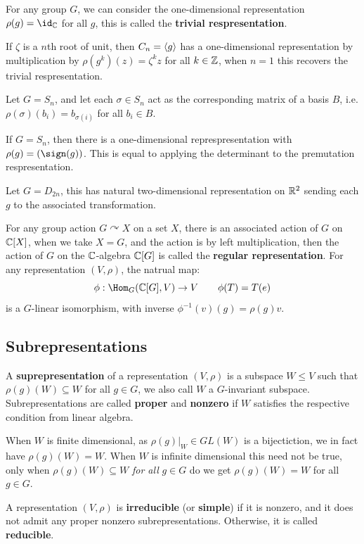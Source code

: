 \documentclass{article}
\begin{document}
For any group $G$, we can consider the one-dimensional representation $\rho(g)=\id_\bC$ for all $g$, this is called the \textbf{trivial respresentation}.

If $\zeta$ is a $n$th root of unit, then $C_n=\left\langle g \right\rangle$ has a one-dimensional representation by multiplication by $\rho(g^k)(z)=\zeta^k z$ for all $k\in\mathbb{Z}$, when $n=1$ this recovers the trivial respresentation.

Let $G=S_n$, and let each $\sigma\in S_n$ act as the corresponding matrix of a basis $B$, i.e. $\rho(\sigma)(b_i)=b_{\sigma(i)}$ for all $b_i\in B$.

If $G=S_n$, then there is a one-dimensional represpresentation with $\rho(g)=(\sign(g))$. This is equal to applying the determinant to the premutation respresentation.

Let $G=D_{2n}$, this has natural two-dimensional representation on $\mathbb{R}^2$ sending each $g$ to the associated transformation.

For any group action $G\curvearrowright X$ on a set $X$, there is an associated action of $G$ on $\mathbb{C}[X]$, when we take $X=G$, and the action is by left multiplication, then the action of $G$ on the $\mathbb{C}$-algebra $\mathbb{C}[G]$ is called the \textbf{regular representation}. For any representation $(V,\rho)$, the natrual map: \[
    \phi: \Hom_G(\bC[G],V)\rightarrow V \qquad \phi(T) = T(e)
\] is a $G$-linear isomorphism, with inverse $\phi^{-1}(v)(g)=\rho(g)v$.

\subsection{Subrepresentations}

\begin{definition}
    A \textbf{suprepresentation} of a representation $(V,\rho)$ is a subspace $W\leq V$ such that $\rho(g)(W)\subseteq W$ for all $g\in G$, we also call $W$ a $G$-invariant subspace. Subrepresentations are called \textbf{proper} and \textbf{nonzero} if $W$ satisfies the respective condition from linear algebra.
\end{definition}

When $W$ is finite dimensional, as $\rho(g)\vert_W\in GL(W)$ is a bijectiction, we in fact have $\rho(g)(W)=W$. When $W$ is infinite dimensional this need not be true, only when $\rho(g)(W)\subseteq W$ \textit{for all} $g\in G$ do we get $\rho(g)(W)=W$ for all $g\in G$.

\begin{definition}
    A representation $(V,\rho)$ is \textbf{irreducible} (or \textbf{simple}) if it is nonzero, and it does not admit any proper nonzero subrepresentations. Otherwise, it is called \textbf{reducible}.
\end{definition}
\end{document}
